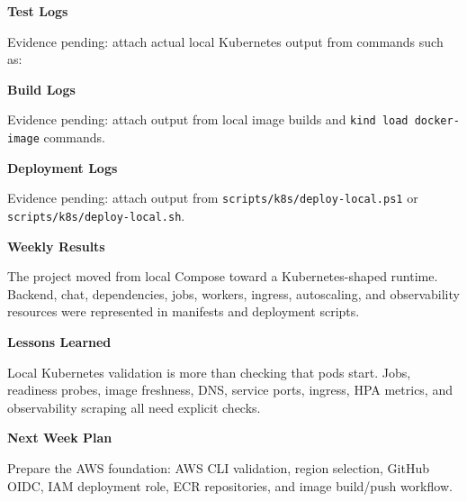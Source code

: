 \vspace{0.5em}\noindent\textbf{Test Logs}\par

Evidence pending: attach actual local Kubernetes output from commands
such as:

\begin{Shaded}
\begin{Highlighting}[]
\end{Highlighting}
\end{Shaded}

\vspace{0.5em}\noindent\textbf{Build Logs}\par

Evidence pending: attach output from local image builds and
\texttt{kind\ load\ docker-\allowbreak{}image} commands.

\vspace{0.5em}\noindent\textbf{Deployment Logs}\par

Evidence pending: attach output from
\texttt{scripts/\allowbreak{}k8s/\allowbreak{}deploy-\allowbreak{}local.\allowbreak{}ps1} or
\texttt{scripts/\allowbreak{}k8s/\allowbreak{}deploy-\allowbreak{}local.\allowbreak{}sh}.

\vspace{0.5em}\noindent\textbf{Weekly Results}\par

The project moved from local Compose toward a Kubernetes-shaped runtime.
Backend, chat, dependencies, jobs, workers, ingress, autoscaling, and
observability resources were represented in manifests and deployment
scripts.

\vspace{0.5em}\noindent\textbf{Lessons Learned}\par

Local Kubernetes validation is more than checking that pods start. Jobs,
readiness probes, image freshness, DNS, service ports, ingress, HPA
metrics, and observability scraping all need explicit checks.

\vspace{0.5em}\noindent\textbf{Next Week Plan}\par

Prepare the AWS foundation: AWS CLI validation, region selection, GitHub
OIDC, IAM deployment role, ECR repositories, and image build/push
workflow.
